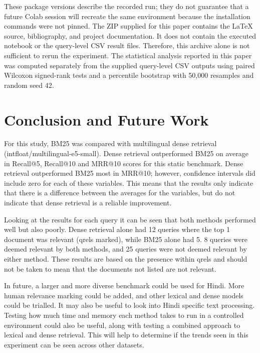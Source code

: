\documentclass[10pt]{article}
\begin{document}
These package versions describe the recorded run; they do not guarantee that a future Colab session will recreate the same environment because the installation commands were not pinned. The ZIP supplied for this paper contains the LaTeX source, bibliography, and project documentation. It does not contain the executed notebook or the query-level CSV result files. Therefore, this archive alone is not sufficient to rerun the experiment. The statistical analysis reported in this paper was computed separately from the supplied query-level CSV outputs using paired Wilcoxon signed-rank tests and a percentile bootstrap with 50,000 resamples and random seed 42.

\section{Conclusion and Future Work}
For this study, BM25 was compared with multilingual dense retrieval (intfloat/multilingual-e5-small). Dense retrieval outperformed BM25 on average in Recall@5, Recall@10 and MRR@10 scores for this static benchmark. Dense retrieval outperformed BM25 most in MRR@10; however, confidence intervals did include zero for each of these variables. This means that the results only indicate that there is a difference between the averages for the variables, but do not indicate that dense retrieval is a reliable improvement.

Looking at the results for each query it can be seen that both methods performed well but also poorly. Dense retrieval alone had 12 queries where the top 1 document was relevant (qrels marked), while BM25 alone had 5. 8 queries were deemed relevant by both methods, and 25 queries were not deemed relevant by either method. These results are based on the presence within qrels and should not be taken to mean that the documents not listed are not relevant.

In future, a larger and more diverse benchmark could be used for Hindi. More human relevance marking could be added, and other lexical and dense models could be trialled. It may also be useful to look into Hindi specific text processing. Testing how much time and memory each method takes to run in a controlled environment could also be useful, along with testing a combined approach to lexical and dense retrieval. This will help to determine if the trends seen in this experiment can be seen across other datasets.
\end{document}
